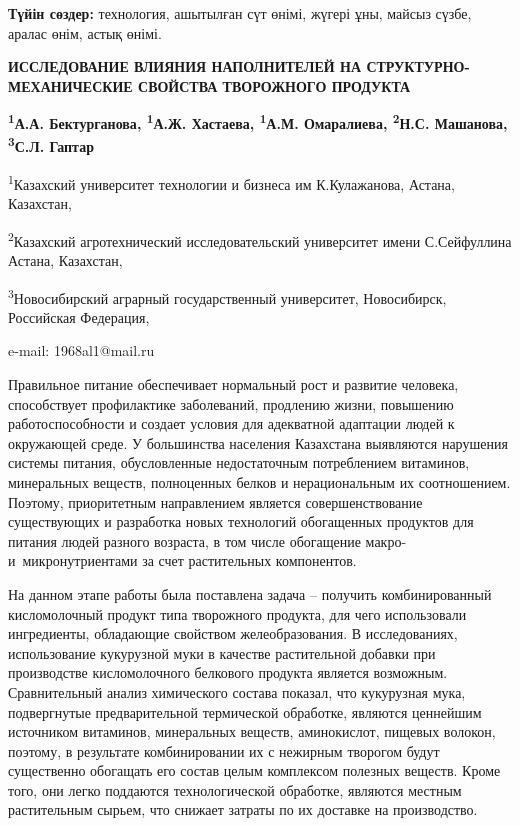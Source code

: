 {\bfseries Түйін сөздер:} технология, ашытылған сүт өнімі, жүгері ұны,
майсыз сүзбе, аралас өнім, астық өнімі.

\begin{articleheader}
{\bfseries ИССЛЕДОВАНИЕ ВЛИЯНИЯ НАПОЛНИТЕЛЕЙ НА СТРУКТУРНО-МЕХАНИЧЕСКИЕ СВОЙСТВА ТВОРОЖНОГО ПРОДУКТА}

{\bfseries
\textsuperscript{1}А.А. Бектурганова\textsuperscript{\envelope },
\textsuperscript{1}А.Ж. Хастаева,
\textsuperscript{1}А.М. Омаралиева,
\textsuperscript{2}Н.С. Машанова,
\textsuperscript{3}С.Л. Гаптар
}
\end{articleheader}

\begin{affiliation}
\textsuperscript{1}Казахский университет технологии и бизнеса им К.Кулажанова, Астана, Казахстан,

\textsuperscript{2}Казахский агротехнический исследовательский университет имени С.Сейфуллина Астана, Казахстан,

\textsuperscript{3}Новосибирский аграрный государственный университет, Новосибирск, Российская Федерация,

e-mail: 1968al1@mail.ru
\end{affiliation}

Правильное питание обеспечивает нормальный рост и развитие человека,
способствует профилактике заболеваний, продлению жизни, повышению
работоспособности и создает условия для адекватной адаптации людей к
окружающей среде. У большинства населения Казахстана выявляются
нарушения системы питания, обусловленные недостаточным потреблением
витаминов, минеральных веществ, полноценных белков и нерациональным их
соотношением. Поэтому, приоритетным направлением является
совершенствование существующих и разработка новых технологий обогащенных
продуктов для питания людей разного возраста, в том числе обогащение
макро- и~микронутриентами за счет растительных компонентов.

На данном этапе работы была поставлена задача -- получить
комбинированный кисломолочный продукт типа творожного продукта, для чего
использовали ингредиенты, обладающие свойством желеобразования. В
исследованиях, использование кукурузной муки в качестве растительной
добавки при производстве кисломолочного белкового продукта является
возможным. Сравнительный анализ химического состава показал, что
кукурузная мука, подвергнутые предварительной термической обработке,
являются ценнейшим источником витаминов, минеральных веществ,
амино­кислот, пищевых волокон, поэтому, в результате комбинировании их с
нежир­ным творогом будут существенно обогащать его состав целым
комплексом полезных веществ. Кроме того, они легко поддаются
технологической обра­ботке, являются местным растительным сырьем, что
снижает затраты по их доставке на производство.

